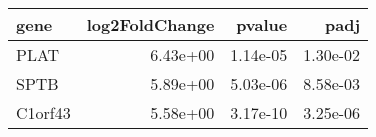 \begin{tabular}{lrrr}
\toprule
   gene &  log2FoldChange &   pvalue &     padj \\
\midrule
   PLAT &        6.43e+00 & 1.14e-05 & 1.30e-02 \\
   SPTB &        5.89e+00 & 5.03e-06 & 8.58e-03 \\
C1orf43 &        5.58e+00 & 3.17e-10 & 3.25e-06 \\
\bottomrule
\end{tabular}
